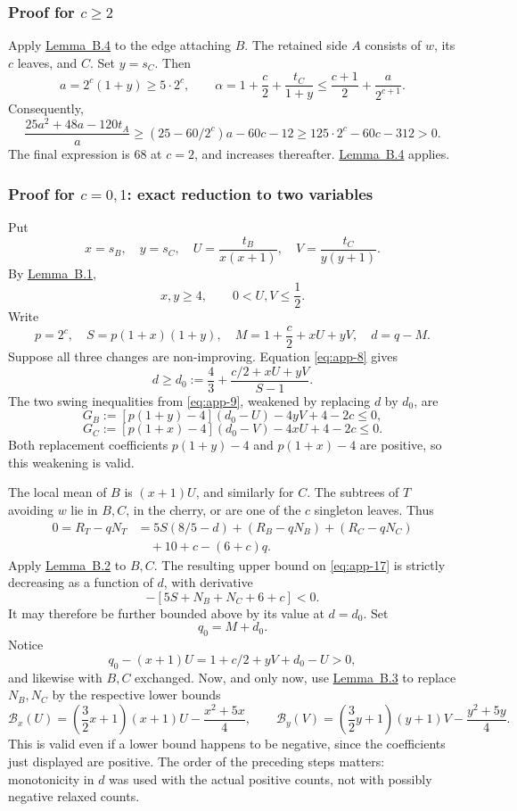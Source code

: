 \documentclass[11pt,reqno]{amsart}
\theoremstyle{plain}
\begin{document}
\subsubsection*{\texorpdfstring{Proof for \(c\ge2\)}{Proof for c >= 2}}\label{proof-for-cge2}

Apply \hyperref[lem:app-4]{Lemma~B.4} to the edge attaching \(B\). The retained side \(A\) consists of \(w\), its \(c\) leaves, and \(C\). Set \(y=s_C\). Then \[
a=2^c(1+y)\ge5\cdot2^c,
\qquad
\alpha=1+\frac c2+\frac{t_C}{1+y}
\le\frac{c+1}{2}+\frac{a}{2^{c+1}}.
\] Consequently, \[
\frac{25a^2+48a-120t_A}{a}
\ge(25-60/2^c)a-60c-12
\ge125\cdot2^c-60c-312>0.
\] The final expression is 68 at \(c=2\), and increases thereafter. \hyperref[lem:app-4]{Lemma~B.4} applies.

\subsubsection*{\texorpdfstring{Proof for \(c=0,1\): exact reduction to two variables}{Proof for c=0,1: exact reduction to two variables}}\label{proof-for-c01-exact-reduction-to-two-variables}

Put \[
x=s_B,\quad y=s_C,\quad
U=\frac{t_B}{x(x+1)},\quad V=\frac{t_C}{y(y+1)}.
\] By \hyperref[lem:app-1]{Lemma~B.1}, \[
x,y\ge4,\qquad 0<U,V\le\frac12.
\tag{B.13}\label{eq:app-13}
\] Write \[
p=2^c,\quad S=p(1+x)(1+y),\quad
M=1+\frac c2+xU+yV,\quad d=q-M.
\] Suppose all three changes are non-improving. Equation \eqref{eq:app-8} gives \[
d\ge d_0:=\frac43+\frac{c/2+xU+yV}{S-1}.
\tag{B.14}\label{eq:app-14}
\] The two swing inequalities from \eqref{eq:app-9}, weakened by replacing \(d\) by \(d_0\), are \[
G_B:=[p(1+y)-4](d_0-U)-4yV+4-2c\le0,
\tag{B.15}\label{eq:app-15}
\] \[
G_C:=[p(1+x)-4](d_0-V)-4xU+4-2c\le0.
\tag{B.16}\label{eq:app-16}
\] Both replacement coefficients \(p(1+y)-4\) and \(p(1+x)-4\) are positive, so this weakening is valid.

The local mean of \(B\) is \((x+1)U\), and similarly for \(C\). The subtrees of \(T\) avoiding \(w\) lie in \(B,C\), in the cherry, or are one of the \(c\) singleton leaves. Thus \[
\begin{aligned}
0=R_T-qN_T
&=5S(8/5-d)+(R_B-qN_B)+(R_C-qN_C)\\
&\quad+10+c-(6+c)q.
\end{aligned}
\tag{B.17}\label{eq:app-17}
\] Apply \hyperref[lem:app-2]{Lemma~B.2} to \(B,C\). The resulting upper bound on \eqref{eq:app-17} is strictly decreasing as a function of \(d\), with derivative \[
-[5S+N_B+N_C+6+c]<0.
\] It may therefore be further bounded above by its value at \(d=d_0\). Set \[
q_0=M+d_0.
\] Notice \[
q_0-(x+1)U=1+c/2+yV+d_0-U>0,
\] and likewise with \(B,C\) exchanged. Now, and only now, use \hyperref[lem:app-3]{Lemma~B.3} to replace \(N_B,N_C\) by the respective lower bounds \[
\mathcal B_x(U)=\left(\frac32x+1\right)(x+1)U-\frac{x^2+5x}{4},
\qquad
\mathcal B_y(V)=\left(\frac32y+1\right)(y+1)V-\frac{y^2+5y}{4}.
\tag{B.18}\label{eq:app-18}
\] This is valid even if a lower bound happens to be negative, since the coefficients just displayed are positive. The order of the preceding steps matters: monotonicity in \(d\) was used with the actual positive counts, not with possibly negative relaxed counts.
\end{document}
